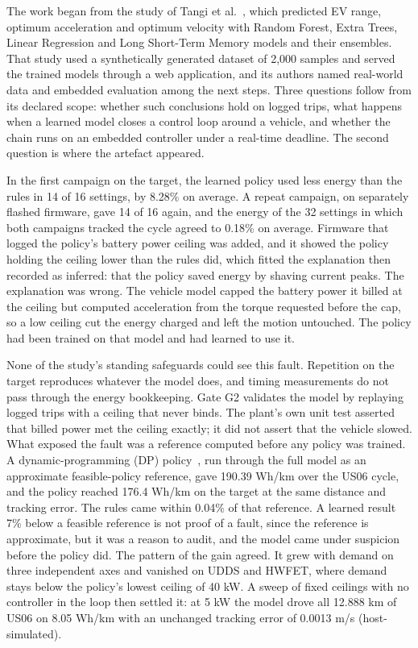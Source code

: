\documentclass{ieeeaccess}
\begin{document}
The work began from the study of Tangi et al.~\cite{tangi2025}, which predicted EV range, optimum acceleration and optimum velocity with Random Forest, Extra Trees, Linear Regression and Long Short-Term Memory models and their ensembles. That study used a synthetically generated dataset of 2,000 samples and served the trained models through a web application, and its authors named real-world data and embedded evaluation among the next steps. Three questions follow from its declared scope: whether such conclusions hold on logged trips, what happens when a learned model closes a control loop around a vehicle, and whether the chain runs on an embedded controller under a real-time deadline. The second question is where the artefact appeared.

In the first campaign on the target, the learned policy used less energy than the rules in 14 of 16 settings, by 8.28\% on average. A repeat campaign, on separately flashed firmware, gave 14 of 16 again, and the energy of the 32 settings in which both campaigns tracked the cycle agreed to 0.18\% on average. Firmware that logged the policy's battery power ceiling was added, and it showed the policy holding the ceiling lower than the rules did, which fitted the explanation then recorded as inferred: that the policy saved energy by shaving current peaks. The explanation was wrong. The vehicle model capped the battery power it billed at the ceiling but computed acceleration from the torque requested before the cap, so a low ceiling cut the energy charged and left the motion untouched. The policy had been trained on that model and had learned to use it.

None of the study's standing safeguards could see this fault. Repetition on the target reproduces whatever the model does, and timing measurements do not pass through the energy bookkeeping. Gate G2 validates the model by replaying logged trips with a ceiling that never binds. The plant's own unit test asserted that billed power met the ceiling exactly; it did not assert that the vehicle slowed. What exposed the fault was a reference computed before any policy was trained. A dynamic-programming (DP) policy~\cite{bellman1957}, run through the full model as an approximate feasible-policy reference, gave 190.39 Wh/km over the US06 cycle, and the policy reached 176.4 Wh/km on the target at the same distance and tracking error. The rules came within 0.04\% of that reference. A learned result 7\% below a feasible reference is not proof of a fault, since the reference is approximate, but it was a reason to audit, and the model came under suspicion before the policy did. The pattern of the gain agreed. It grew with demand on three independent axes and vanished on UDDS and HWFET, where demand stays below the policy's lowest ceiling of 40 kW. A sweep of fixed ceilings with no controller in the loop then settled it: at 5 kW the model drove all 12.888 km of US06 on 8.05 Wh/km with an unchanged tracking error of 0.0013 m/s (host-simulated).
\end{document}
